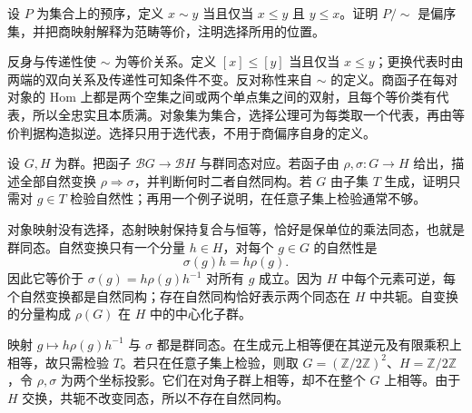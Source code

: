 \begin{exercise}\label{b4:ex:01-preorder-quotient}
	设 \(P\) 为集合上的预序，定义 \(x\sim y\) 当且仅当 \(x\le y\) 且 \(y\le x\)。证明 \(P/{\sim}\) 是偏序集，并把商映射解释为范畴等价，注明选择所用的位置。
\end{exercise}
\begin{solution}
	反身与传递性使 \(\sim\) 为等价关系。定义 \([x]\le[y]\) 当且仅当 \(x\le y\)；更换代表时由两端的双向关系及传递性可知条件不变。反对称性来自 \(\sim\) 的定义。商函子在每对对象的 Hom 上都是两个空集之间或两个单点集之间的双射，且每个等价类有代表，所以全忠实且本质满。对象集为集合，选择公理可为每类取一个代表，再由等价判据构造拟逆。选择只用于选代表，不用于商偏序自身的定义。
\end{solution}

\begin{exercise}\label{b4:ex:01-group-functors-intertwiners}
	设 \(G,H\) 为群。把函子 \(\mathcal BG\rightarrow\mathcal BH\) 与群同态对应。若函子由 \(\rho,\sigma:G\rightarrow H\) 给出，描述全部自然变换 \(\rho\Rightarrow\sigma\)，并判断何时二者自然同构。若 \(G\) 由子集 \(T\) 生成，证明只需对 \(g\in T\) 检验自然性；再用一个例子说明，在任意子集上检验通常不够。
\end{exercise}
\begin{solution}
	对象映射没有选择，态射映射保持复合与恒等，恰好是保单位的乘法同态，也就是群同态。自然变换只有一个分量 \(h\in H\)，对每个 \(g\in G\) 的自然性是
	\[
		\sigma(g)h=h\rho(g).
	\]
	因此它等价于 \(\sigma(g)=h\rho(g)h^{-1}\) 对所有 \(g\) 成立。因为 \(H\) 中每个元素可逆，每个自然变换都是自然同构；存在自然同构恰好表示两个同态在 \(H\) 中共轭。自变换的分量构成 \(\rho(G)\) 在 \(H\) 中的中心化子群。

	映射 \(g\mapsto h\rho(g)h^{-1}\) 与 \(\sigma\) 都是群同态。在生成元上相等便在其逆元及有限乘积上相等，故只需检验 \(T\)。若只在任意子集上检验，则取 \(G=(\mathbb Z/2\mathbb Z)^2\)、\(H=\mathbb Z/2\mathbb Z\)，令 \(\rho,\sigma\) 为两个坐标投影。它们在对角子群上相等，却不在整个 \(G\) 上相等。由于 \(H\) 交换，共轭不改变同态，所以不存在自然同构。
\end{solution}


